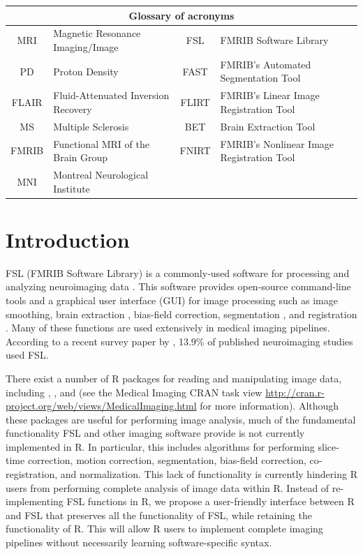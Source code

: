 {\scriptsize
\begin{tabular}{cl|cl}
\multicolumn{4}{c}{Glossary of acronyms} \\ \hline
MRI & Magnetic Resonance Imaging/Image & FSL & FMRIB Software Library \\
PD & Proton Density & FAST & FMRIB's Automated Segmentation Tool \\
FLAIR & Fluid-Attenuated Inversion Recovery & FLIRT & FMRIB's Linear Image Registration Tool \\
MS & Multiple Sclerosis & BET & Brain Extraction Tool \\
FMRIB & Functional MRI of the Brain Group & FNIRT & FMRIB's Nonlinear Image Registration Tool \\
MNI & Montreal Neurological Institute \\
\hline
\end{tabular}
}


\section{Introduction}
\label{sec:intro}

FSL (FMRIB Software Library) is a commonly-used software for processing and analyzing neuroimaging data \citep{jenkinson_fsl_2012}.  This software provides open-source command-line tools and a graphical user interface (GUI) for image processing such as image smoothing, brain extraction \citep{smith_fast_2002}, bias-field correction, segmentation \citep{zhang_segmentation_2001}, and registration \citep{jenkinson_global_2001, jenkinson_improved_2002}.    Many of these functions are used extensively in medical imaging pipelines.   According to a recent survey paper by \citet{carp_secret_2012}, 13.9\% of published neuroimaging studies used FSL.

There exist a number of R packages for reading and manipulating image data, including  \citep{bordier_temporal_2011},  \citep{modat_rniftyreg:_2013}, and  \citep{tabelow_statistical_2011} (see the Medical Imaging CRAN task view \url{http://cran.r-project.org/web/views/MedicalImaging.html} for more information).  Although these packages are useful for performing image analysis, much of the fundamental functionality FSL and other imaging software provide is not currently implemented in R.  In particular, this includes algorithms for performing slice-time correction, motion correction, segmentation, bias-field correction, co-registration, and normalization. This lack of functionality is currently hindering R users from performing complete analysis of image data within R.  Instead of re-implementing FSL functions in R, we propose a user-friendly interface between R and FSL that preserves all the functionality of FSL, while retaining the functionality of R.  This will allow
R users to implement complete imaging pipelines without necessarily learning software-specific syntax.  


